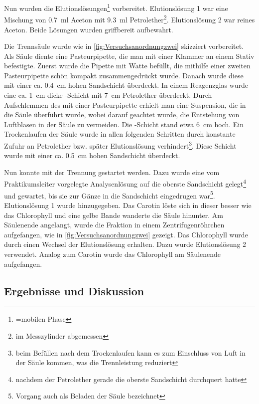 \documentclass{article}
\begin{document}
        Nun wurden die Elutionslösungen\footnote{=mobilen Phase} vorbereitet. Elutionslösung 1 war eine Mischung von \SI[mode=text]{0.7}{\milli\litre} Aceton mit \SI[mode=text]{9.3}{\milli\litre} Petrolether\footnote{im Messzylinder abgemessen}. Elutionslösung 2 war reines Aceton. Beide Lösungen wurden griffbereit aufbewahrt.
        
        Die Trennsäule wurde wie in \ref{fig:Versuchsanordnungzwei} skizziert vorbereitet. Als Säule diente eine Pasteurpipette, die man mit einer Klammer an einem Stativ befestigte. Zuerst wurde die Pipette mit Watte befüllt, die mithilfe einer zweiten Pasteurpipette schön kompakt zusammengedrückt wurde. Danach wurde diese mit einer ca. \SI[mode=text]{0.4}{\centi\meter} hohen Sandschicht überdeckt. In einem Reagenzglas wurde eine ca. \SI[mode=text]{1}{\centi\meter} dicke -Schicht mit \SI[mode=text]{7}{\centi\meter} Petrolether überdeckt. Durch Aufschlemmen des  mit einer Pasteurpipette  erhielt man eine Suspension, die in die Säule überführt wurde, wobei darauf geachtet wurde, die Entstehung von Luftblasen in der Säule zu vermeiden. Die -Schicht stand etwa \SI[mode=text]{6}{\centi\meter} hoch. Ein Trockenlaufen der Säule wurde in allen folgenden Schritten durch konstante Zufuhr an Petrolether bzw. später Elutionslösung verhindert\footnote{beim Befüllen nach dem Trockenlaufen kann es zum Einschluss von Luft in der Säule kommen, was die Trennleistung reduziert}. Diese Schicht wurde mit einer ca. \SI[mode=text]{0.5}{\centi\meter} hohen Sandschicht überdeckt. 
        
        Nun konnte mit der Trennung gestartet werden. Dazu wurde eine vom Praktikumsleiter vorgelegte Analysenlösung auf die oberste Sandschicht gelegt\footnote{nachdem der Petrolether gerade die oberste Sandschicht durchquert hatte} und gewartet, bis sie zur Gänze in die Sandschicht eingedrugen war\footnote{Vorgang auch als Beladen der Säule bezeichnet}. Elutionslösung 1 wurde hinzugegeben. Das Carotin löste sich in dieser besser wie das Chlorophyll und eine gelbe Bande wanderte die Säule hinunter. Am Säulenende angelangt, wurde die Fraktion in einem Zentrifugenröhrchen aufgefangen, wie in \ref{fig:Versuchsanordnungzwei} gezeigt. Das Chlorophyll wurde durch einen Wechsel der Elutionslösung erhalten. Dazu wurde Elutionslösung 2 verwendet. Analog zum Carotin wurde das Chlorophyll am Säulenende aufgefangen.
        
    \subsection{Ergebnisse und Diskussion}
    
\end{document}
